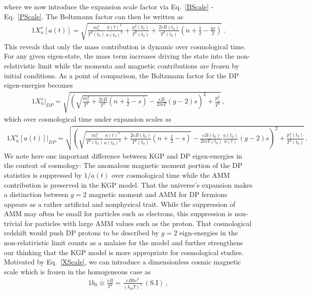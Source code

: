 \documentclass[
aps,
pra,
showpacs,
preprintnumbers,
amsmath,
amssymb,
footinbib
]{revtex4-2}
\newcommand*{\req}[1]{Eq.~{\eqref{#1}}}
\begin{document}
where we now introduce the expansion scale factor via \req{BScale} - \req{PScale}. The Boltzmann factor can then be written as
\begin{alignat}{1}
    \label{XScale} X_{n}^{s}[a(t)] = \sqrt{\frac{m_{e}^{2}}{T^{2}(t_{0})}\frac{a(t)^{2}}{a(t_{0})^{2}}+\frac{p_{z}^{2}(t_{0})}{T^{2}(t_{0})}+\frac{2eB(t_{0})}{T^{2}(t_{0})}\left(n+\frac{1}{2}-\frac{gs}{2}\right)}\,.
\end{alignat}
This reveals that only the mass contribution is dynamic over cosmological time. For any given eigen-state, the mass term increases driving the state into the non-relativistic limit while the momenta and magnetic contributions are frozen by initial conditions. As a point of comparison, the Boltzmann factor for the DP eigen-energies becomes
\begin{alignat}{1}
    \label{XDP} X_{n}^{s}\vert_{DP} = \sqrt{\left(\sqrt{\frac{m_{e}^{2}}{T^{2}}+\frac{2eB}{T^{2}}\left(n+\frac{1}{2}-s\right)}-\frac{eB}{2mT}(g-2)s\right)^{2}+\frac{p_{z}^{2}}{T^{2}}}\,,
\end{alignat}
which over cosmological time under expansion scales as
\begin{alignat}{1}
    \label{XScaleDP} X_{n}^{s}[a(t)]\vert_{DP} = \sqrt{\left(\sqrt{\frac{m_{e}^{2}}{T^{2}(t_{0})}\frac{a(t)^{2}}{a(t_{0})^{2}}+\frac{2eB(t_{0})}{T^{2}(t_{0})}\left(n+\frac{1}{2}-s\right)}-\frac{eB(t_{0})}{2mT(t_{0})}\frac{a(t_{0})}{a(t)}(g-2)s\right)^{2}+\frac{p_{z}^{2}(t_{0})}{T^{2}(t_{0})}}\,.
\end{alignat}
We note here one important difference between KGP and DP eigen-energies in the context of cosmology: The anomalous magnetic moment portion of the DP statistics is suppressed by $1/a(t)$ over cosmological time while the AMM contribution is preserved in the KGP model. That the universe's expansion makes a distinction between $g=2$ magnetic moment and AMM for DP fermions appears as a rather artificial and nonphysical trait. While the suppression of AMM may often be small for particles such as electrons, this suppression is non-trivial for particles with large AMM values such as the proton. That cosmological redshift would push DP protons to be described by $g=2$ eign-energies in the non-relativistic limit counts as a malaise for the model and further strengthens our thinking that the KGP model is more appropriate for cosmological studies. Motivated by \req{XScale}, we can introduce a dimensionless cosmic magnetic scale which is frozen in the homogeneous case as
\begin{alignat}{1}
    \label{Bo} b_{0}\equiv\frac{eB}{T^{2}}=\frac{eB\hbar c^{2}}{(k_{B}T)^{2}}\ \mathrm{(S.I)}\,,
\end{alignat}
\end{document}

